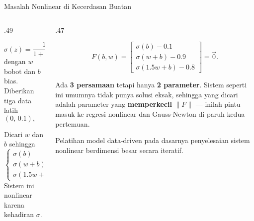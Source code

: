 \documentclass[aspectratio=169,10pt]{beamer}
\begin{document}
\begin{frame}{Masalah Nonlinear di Kecerdasan Buatan}
\tiny
\begin{columns}[T,totalwidth=\textwidth]
\begin{column}{.49\textwidth}
\begin{bluebox}
\[
\sigma(z)=\frac{1}{1+e^{-z}},\qquad y=\sigma(wx+b),
\]
dengan $w$ bobot dan $b$ bias. Diberikan tiga data latih
\[
(0,\,0.1),\quad(1,\,0.9),\quad(1.5,\,0.8).
\]
\end{bluebox}
\begin{orangebox}
Dicari $w$ dan $b$ sehingga
\[
\left\{
\begin{aligned}
\sigma(b)&=0.1\\
\sigma(w+b)&=0.9\\
\sigma(1.5w+b)&=0.8
\end{aligned}\right.
\]
Sistem ini nonlinear karena kehadiran $\sigma$.
\end{orangebox}
\end{column}
\begin{column}{.47\textwidth}
\begin{greenbox}
\[
F(b,w)=
\begin{bmatrix}
\sigma(b)-0.1\\
\sigma(w+b)-0.9\\
\sigma(1.5w+b)-0.8
\end{bmatrix}=\vec{0}.
\]
\end{greenbox}
\begin{purplebox}[Perhatikan]
Ada \textbf{3 persamaan} tetapi hanya \textbf{2 parameter}. Sistem seperti ini umumnya tidak punya solusi eksak, sehingga yang dicari adalah parameter yang \textbf{memperkecil} $\|F\|$ --- inilah pintu masuk ke regresi nonlinear dan Gauss-Newton di paruh kedua pertemuan.
\end{purplebox}
\begin{goldbox}
Pelatihan model data-driven pada dasarnya penyelesaian sistem nonlinear berdimensi besar secara iteratif.
\end{goldbox}
\end{column}
\end{columns}
\end{frame}
\end{document}
